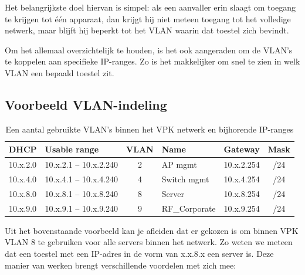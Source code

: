 Het belangrijkste doel hiervan is simpel: als een aanvaller erin slaagt om toegang te krijgen tot één apparaat, dan krijgt hij niet meteen toegang tot het volledige netwerk, maar blijft hij beperkt tot het VLAN waarin dat toestel zich bevindt.

Om het allemaal overzichtelijk te houden, is het ook aangeraden om de VLAN’s te koppelen aan specifieke IP-ranges. Zo is het makkelijker om snel te zien in welk VLAN een bepaald toestel zit.

\subsection*{Voorbeeld VLAN-indeling}

\begin{table}[h!]
    \centering
    \begin{tabular}{|l|l|c|l|l|c|}
        \hline
        \textbf{DHCP} & \textbf{Usable range} & \textbf{VLAN} & \textbf{Name} & \textbf{Gateway} & \textbf{Mask} \\
        \hline
        10.x.2.0 & 10.x.2.1 -- 10.x.2.240 & 2 & AP mgmt & 10.x.2.254 & /24 \\
        10.x.4.0 & 10.x.4.1 -- 10.x.4.240 & 4 & Switch mgmt & 10.x.4.254 & /24 \\
        10.x.8.0 & 10.x.8.1 -- 10.x.8.240 & 8 & Server & 10.x.8.254 & /24 \\
        10.x.9.0 & 10.x.9.1 -- 10.x.9.240 & 9 & RF\_Corporate & 10.x.9.254 & /24 \\
        \hline
    \end{tabular}
    \caption{Een aantal gebruikte VLAN's binnen het VPK netwerk en bijhorende IP-ranges}
\end{table}

Uit het bovenstaande voorbeeld kan je afleiden dat er gekozen is om binnen VPK VLAN 8 te gebruiken voor alle servers binnen het netwerk. Zo weten we meteen dat een toestel met een IP-adres in de vorm van x.x.8.x een server is. Deze manier van werken brengt verschillende voordelen met zich mee:

